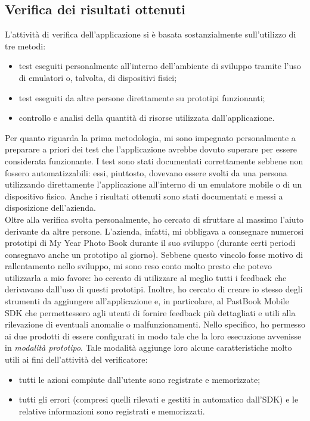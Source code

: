 		\subsection{Verifica dei risultati ottenuti}
			L'attività di verifica dell'applicazione si è basata sostanzialmente sull'utilizzo di tre metodi:
			\begin{itemize}
				\item test eseguiti personalmente all'interno dell'ambiente di sviluppo tramite l'uso di emulatori o, talvolta, di
				dispositivi fisici;
				\item test eseguiti da altre persone direttamente su prototipi funzionanti;
				\item controllo e analisi della quantità di risorse utilizzata dall'applicazione.
			\end{itemize}
			Per quanto riguarda la prima metodologia, mi sono impegnato personalmente a preparare a priori dei test che l'applicazione
			avrebbe dovuto superare per essere considerata funzionante. I test sono stati documentati correttamente sebbene non fossero
			automatizzabili: essi, piuttosto, dovevano essere svolti da una persona utilizzando direttamente l'applicazione all'interno
			di un emulatore mobile o di un dispositivo fisico. Anche i risultati ottenuti sono stati documentati e messi a disposizione
			dell'azienda.\\
			Oltre alla verifica svolta personalmente, ho cercato di sfruttare al massimo l'aiuto derivante da altre persone. L'azienda,
			infatti, mi obbligava a consegnare numerosi prototipi di My Year Photo Book durante il suo sviluppo (durante certi periodi
			consegnavo anche un prototipo al giorno). Sebbene questo vincolo fosse motivo di rallentamento nello sviluppo, mi sono reso
			conto molto presto che potevo utilizzarla a mio favore: ho cercato di utilizzare al meglio tutti i feedback che derivavano
			dall'uso di questi prototipi. Inoltre, ho cercato di creare io stesso degli strumenti da aggiungere all'applicazione e,
			in particolare, al PastBook Mobile SDK che permettessero agli utenti di fornire feedback più dettagliati e utili alla
			rilevazione di eventuali anomalie o malfunzionamenti. Nello specifico, ho permesso ai due prodotti di essere configurati
			in modo tale che la loro esecuzione avvenisse in \emph{modalità prototipo}. Tale modalità aggiunge loro alcune
			caratteristiche molto utili ai fini dell'attività del verificatore:
			\begin{itemize}
				\item tutti le azioni compiute dall'utente sono registrate e memorizzate;
				\item tutti gli errori (compresi quelli rilevati e gestiti in automatico dall'SDK) e le relative informazioni sono
				registrati e memorizzati.
			\end{itemize}

